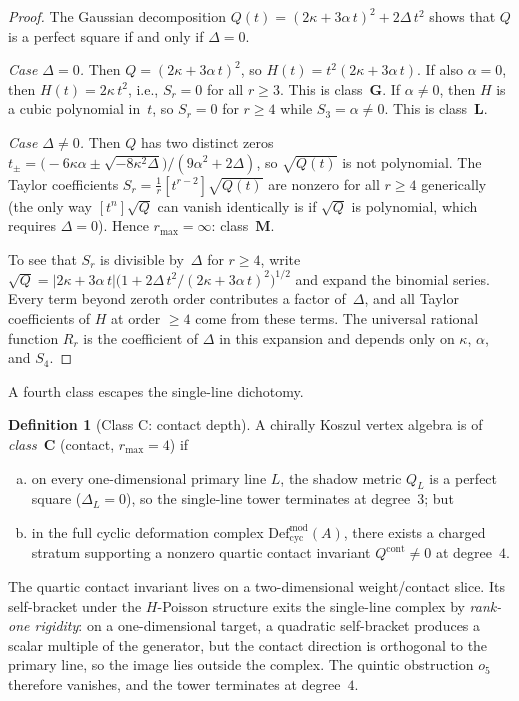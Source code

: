 \documentclass[11pt]{article}
\theoremstyle{plain}
\theoremstyle{definition}
\newtheorem{definition}[theorem]{Definition}
\theoremstyle{remark}
\newcommand{\Defcyc}{\mathrm{Def}_{\mathrm{cyc}}}
\begin{document}
\begin{proof}
The Gaussian decomposition
$Q(t) = (2\kappa + 3\alpha\,t)^2 + 2\Delta\,t^2$
shows that $Q$ is a perfect square if and only if
$\Delta = 0$.

\emph{Case $\Delta = 0$.}
Then $Q = (2\kappa + 3\alpha\,t)^2$, so
$H(t) = t^2(2\kappa + 3\alpha\,t)$.
If also $\alpha = 0$, then $H(t) = 2\kappa\,t^2$,
i.e., $S_r = 0$ for all $r \geq 3$. This is class~$\mathbf{G}$.
If $\alpha \neq 0$, then $H$ is a cubic polynomial in~$t$,
so $S_r = 0$ for $r \geq 4$ while $S_3 = \alpha \neq 0$.
This is class~$\mathbf{L}$.

\emph{Case $\Delta \neq 0$.}
Then $Q$ has two distinct zeros
$t_{\pm} = \bigl(-6\kappa\alpha \pm
\sqrt{-8\kappa^2\Delta}\bigr)\big/
(9\alpha^2 + 2\Delta)$,
so $\sqrt{Q(t)}$ is not polynomial. The Taylor coefficients
$S_r = \frac{1}{r}[t^{r-2}]\sqrt{Q(t)}$ are nonzero for all
$r \geq 4$ generically (the only way $[t^n]\sqrt{Q}$ can
vanish identically is if $\sqrt{Q}$ is polynomial, which
requires $\Delta = 0$). Hence $r_{\max} = \infty$:
class~$\mathbf{M}$.

To see that $S_r$ is divisible by~$\Delta$ for $r \geq 4$,
write $\sqrt{Q} = |2\kappa + 3\alpha\,t|\bigl(1 +
2\Delta\,t^2/(2\kappa+3\alpha\,t)^2\bigr)^{1/2}$
and expand the binomial series. Every term beyond zeroth
order contributes a factor of~$\Delta$, and all Taylor
coefficients of $H$ at order $\geq 4$ come from these terms.
The universal rational function $R_r$ is the coefficient
of $\Delta$ in this expansion and depends only on
$\kappa$, $\alpha$, and $S_4$.
\end{proof}

A fourth class escapes the single-line dichotomy.

\begin{definition}[Class C: contact depth]\label{def:class-C}
A chirally Koszul vertex algebra is of \emph{class~$\mathbf{C}$}
(contact, $r_{\max} = 4$) if
\begin{enumerate}[(a)]
\item on every one-dimensional primary line $L$, the shadow
 metric $Q_L$ is a perfect square ($\Delta_L = 0$),
 so the single-line tower terminates at degree~$3$; but
\item in the full cyclic deformation complex
 $\Defcyc^{\mathrm{mod}}(A)$, there exists a charged stratum
 supporting a nonzero quartic contact invariant
 $Q^{\mathrm{cont}} \neq 0$ at degree~$4$.
\end{enumerate}
The quartic contact invariant lives on a two-dimensional
weight/contact slice. Its self-bracket under the
$H$-Poisson structure exits the single-line complex by
\emph{rank-one rigidity}: on a one-dimensional target,
a quadratic self-bracket produces a scalar multiple of the
generator, but the contact direction is orthogonal to the
primary line, so the image lies outside the complex.
The quintic obstruction $o_5$ therefore vanishes, and the
tower terminates at degree~$4$.
\end{definition}
\end{document}
